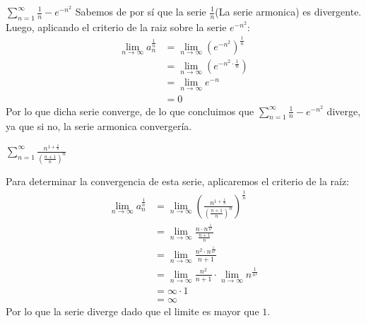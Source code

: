 \documentclass[../main.tex]{subfiles}
\begin{document}
\question $\sum\limits_{n = 1}^\infty \frac{1}{n} - e^{-n^2}$
Sabemos de por sí que la serie $\frac{1}{n}$(La serie armonica) es divergente. Luego, aplicando el criterio de la raiz sobre la serie $e^{-n^2}$:
\begin{align*}
    \lim_{n \to \infty} a_{n}^{\frac{1}{n}} &= \lim_{n \to \infty} \left(e^{-n^2}\right)^{\frac{1}{n}}\\
    &= \lim_{n \to \infty} \left(e^{-n^2 \cdot \frac{1}{n}}\right)\\
    &= \lim_{n \to \infty} e^{-n}\\
    &= 0
\end{align*}
Por lo que dicha serie converge, de lo que concluimos que $\sum\limits_{n = 1}^\infty \frac{1}{n} - e^{-n^2}$ diverge, ya que si no, la serie armonica convergería.


\question $\sum_{n = 1}^\infty \frac{n^{1 + \frac{1}{n}}}{\left(\frac{n+1}{n}\right)^n}$

Para determinar la convergencia de esta serie, aplicaremos el criterio de la raíz:
\begin{align*}
    \lim_{n \to \infty} a_n^{\frac{1}{n}} &= \lim_{n \to \infty} \left(\frac{n^{1 + \frac{1}{n}}}{\left(\frac{n+1}{n}\right)^n}\right)^{\frac{1}{n}}\\
    &= \lim_{n \to \infty} \frac{n \cdot n^{\frac{1}{n^2}}}{\frac{n+1}{n}}\\
    &= \lim_{n \to \infty} \frac{n^2 \cdot n^{\frac{1}{n^2}}}{n+1}\\
    &= \lim_{n \to \infty} \frac{n^2}{n+1} \cdot \lim_{n \to \infty} n^{\frac{1}{n^2}}\\
    &= \infty \cdot 1\\
    &= \infty
\end{align*}
Por lo que la serie diverge dado que el limite es mayor que $1$.
\end{document}
